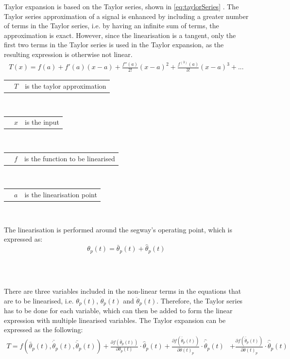 Taylor expansion is based on the Taylor series, shown in \autoref{eq:taylorSeries} \citep{sou:taylorSeries}. The Taylor series approximation of a signal is enhanced by including a greater number of terms in the Taylor series, i.e. by having an infinite sum of terms, the approximation is exact. However, since the linearisation is a tangent, only the first two terms in the Taylor series is used in the Taylor expansion, as the resulting expression is otherwise not linear.
\begin{align}
T(x) = f(a) + f'(a)(x - a) + \frac{f''(a)}{2!}(x - a)^2 + \frac{f^{(3)}(a)}{3!}(x - a)^3 + ...
\label{eq:taylorSeries}
\end{align}
\begin{where}
\begin{tabular}{p{40pt} p{42pt} p{200pt}} &$T$ & is the taylor approximation \end{tabular} \\
\begin{tabular}{p{40pt} p{42pt} p{200pt}} &$x$ & is the input \end{tabular} \\
\begin{tabular}{p{40pt} p{42pt} p{200pt}} &$f$ & is the function to be linearised \end{tabular} \\
\begin{tabular}{p{40pt} p{42pt} p{200pt}} &$a$ & is the linearisation point \end{tabular} \\
\end{where}

The linearisation is performed around the segway's operating point, which is expressed as:
\begin{equation}
\theta_p(t) = \bar{\theta}_p(t) + \hat{\theta}_p(t)
\end{equation}
\begin{where}
\\
\\
\end{where}

There are three variables included in the non-linear terms in the equations that are to be linearised, i.e. $\theta_p(t)$, $\dot\theta_p(t)$ and $\ddot\theta_p(t)$. Therefore, the Taylor series has to be done for each variable, which can then be added to form the linear expression with multiple linearised variables. The Taylor expansion can be expressed as the following:
\begin{align}
T= f(\bar{\theta}_p(t),\bar{\dot \theta}_p(t), \bar{\ddot \theta}_p(t))+ \frac{\partial f(\bar{\theta}_p(t))}{\partial\theta_p(t)}\cdot \hat{\theta}_p(t)+\frac{\partial f(\bar{\dot \theta}_p(t))}{\partial \dot \theta(t)_p}\cdot \hat{\dot \theta}_p(t) &+ \frac{\partial f(\bar{\ddot \theta}_p(t))}{\partial \ddot \theta(t)_p}\cdot \hat{\ddot \theta}_p(t)\label{eq:taylor}
\end{align}

